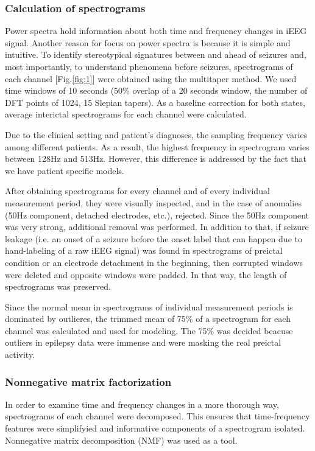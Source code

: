 \documentclass{article}
\begin{document}
\subsubsection{Calculation of spectrograms}

Power spectra hold information about both time and frequency changes in iEEG signal. Another reason for focus on power spectra is because it is simple and intuitive. To identify stereotypical signatures between and ahead of seizures and, most importantly, to understand phenomena before seizures, spectrograms of each channel [Fig.\ref{fig:1}] were obtained using the multitaper method.  We used time windows of 10 seconds ($50\%$ overlap of a 20 seconds window, the number of DFT points of 1024, 15 Slepian tapers). As a baseline correction for both states, average interictal spectrograms for each channel were calculated. 

Due to the clinical setting and patient's diagnoses, the sampling frequency varies among different patients. As a result, the highest frequency in spectrogram varies between 128Hz and 513Hz. However, this difference is addressed by the fact that we have patient specific models. 

After obtaining spectrograms for every channel and of every individual measurement period, they were visually inspected, and in the case of anomalies (50Hz component, detached electrodes, etc.), rejected. Since the 50Hz component was very strong, additional removal was performed. In addition to that, if seizure leakage (i.e. an onset of a seizure before the onset label that can happen due to hand-labeling of a raw iEEG signal) was found in spectrograms of preictal condition or an electrode detachment in the beginning, then corrupted windows were deleted and opposite windows were padded. In that way, the length of spectrograms was preserved. 

Since the normal mean in spectrograms of individual measurement periods is dominated by outlieres, the trimmed mean of 75\% of a spectrogram for each channel was calculated and used for modeling. The 75\% was decided beacuse outliers in epilepsy data were immense and were masking the real preictal activity. 

\subsubsection{Nonnegative matrix factorization}

In order to examine  time and frequency changes in a more thorough way, spectrograms of each channel were decomposed. This ensures that time-frequency features were simplifyied and informative components of a spectrogram isolated. Nonnegative matrix decomposition (NMF) was used as a tool.  
\end{document}
